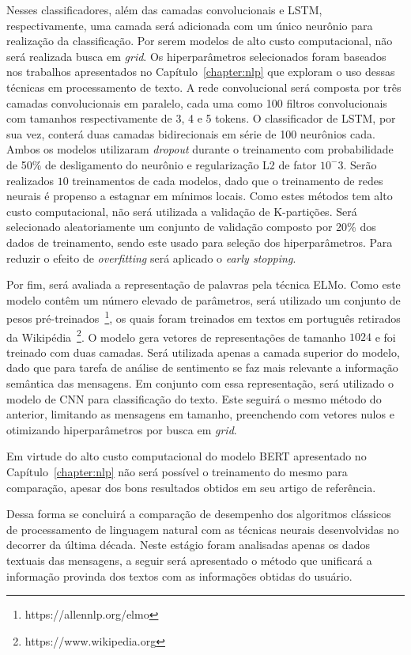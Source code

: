 Nesses classificadores, além das camadas convolucionais e LSTM, respectivamente,
uma camada será adicionada com um único neurônio para realização da
classificação.
Por serem modelos de alto custo computacional, não será realizada busca em
\textit{grid}.
Os hiperparâmetros selecionados foram baseados nos trabalhos apresentados no
Capítulo~\ref{chapter:nlp} que exploram o uso dessas técnicas em processamento
de texto.
A rede convolucional será composta por três camadas convolucionais em paralelo,
cada uma como 100 filtros convolucionais com tamanhos respectivamente de 3, 4 e
5 tokens.
O classificador de LSTM, por sua vez, conterá duas camadas bidirecionais em
série de 100 neurônios cada.
Ambos os modelos utilizaram \textit{dropout} durante o treinamento com
probabilidade de 50\% de desligamento do neurônio e regularização L2 de fator
$10^-3$.
Serão realizados $10$ treinamentos de cada modelos, dado que o treinamento de
redes neurais é propenso a estagnar em mínimos locais.
Como estes métodos tem alto custo computacional, não será utilizada a validação
de K-partições.
Será selecionado aleatoriamente um conjunto de validação composto por 20\% dos
dados de treinamento, sendo este usado para seleção dos hiperparâmetros.
Para reduzir o efeito de \textit{overfitting} será aplicado o \textit{early
stopping}.

Por fim, será avaliada a representação de palavras pela técnica ELMo.
Como este modelo contêm um número elevado de parâmetros, será utilizado um
conjunto de pesos pré-treinados~\footnote{https://allennlp.org/elmo}, os quais
foram treinados em textos em português retirados da
Wikipédia~\footnote{https://www.wikipedia.org}.
O modelo gera vetores de representações de tamanho $1024$ e foi treinado com
duas camadas.
Será utilizada apenas a camada superior do modelo, dado que para tarefa de
análise de sentimento se faz mais relevante a informação semântica das mensagens.
Em conjunto com essa representação, será utilizado o modelo de CNN para
classificação do texto.
Este seguirá o mesmo método do anterior, limitando as mensagens em tamanho,
preenchendo com vetores nulos e otimizando hiperparâmetros por busca em
\textit{grid}.

Em virtude do alto custo computacional do modelo BERT apresentado no
Capítulo~\ref{chapter:nlp} não será possível o treinamento do mesmo para
comparação, apesar dos bons resultados obtidos em seu artigo de referência.

Dessa forma se concluirá a comparação de desempenho dos algoritmos clássicos
de processamento de linguagem natural com as técnicas neurais desenvolvidas no
decorrer da última década.
Neste estágio foram analisadas apenas os dados textuais das mensagens, a seguir
será apresentado o método que unificará a informação provinda dos textos com as
informações obtidas do usuário.

